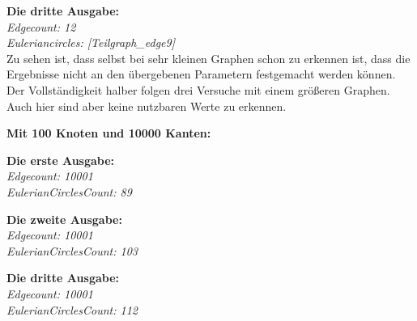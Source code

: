 \textbf{Die dritte Ausgabe:} \\ 
\textit{Edgecount: 12} \\
\textit{Euleriancircles: [Teilgraph\_edge9]}\\

Zu sehen ist, dass selbst bei sehr kleinen Graphen schon zu erkennen ist, dass die Ergebnisse nicht an den übergebenen Parametern festgemacht werden können.\\
Der Vollständigkeit halber folgen drei Versuche mit einem größeren Graphen. Auch hier sind aber keine nutzbaren Werte zu erkennen.

\newpage

\textbf{Mit 100 Knoten und 10000 Kanten:}\\

\begin{minipage}[t]{0.33\textwidth}
    \textbf{Die erste Ausgabe:} \\
    \textit{Edgecount: 10001} \\
    \textit{EulerianCirclesCount: 89}
\end{minipage}%
\begin{minipage}[t]{0.33\textwidth}
    \textbf{Die zweite Ausgabe:} \\
    \textit{Edgecount: 10001} \\
    \textit{EulerianCirclesCount: 103}
\end{minipage}%
\begin{minipage}[t]{0.33\textwidth}
    \textbf{Die dritte Ausgabe:} \\
    \textit{Edgecount: 10001} \\
    \textit{EulerianCirclesCount: 112}
\end{minipage}
